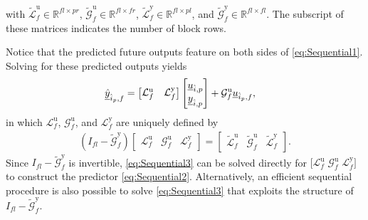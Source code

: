 with ${\widetilde{\mathcal{L}}^\mathrm{u}_f\in\mathbb{R}^{fl\times pr}}$, ${\widetilde{\mathcal{G}}^\mathrm{u}_f\in\mathbb{R}^{fl\times fr}}$, ${\widetilde{\mathcal{L}}^\mathrm{y}_f\in\mathbb{R}^{fl\times pl}}$, and ${\widetilde{\mathcal{G}}^\mathrm{y}_f\in\mathbb{R}^{fl\times fl}}$. The subscript of these matrices indicates the number of block rows.

Notice that the predicted future outputs feature on both sides of \eqref{eq:Sequential1}. Solving for these predicted outputs yields
\begin{align}\label{eq:Sequential2}
    \underline{\hat{y}}_{\hat{i}_p,f} &=
    \begin{bmatrix}
        \mathcal{L}^\mathrm{u}_f & \mathcal{L}^\mathrm{y}_f 
    \end{bmatrix}    
    \begin{bmatrix}
        \underline{u}_{\hat{i},p}\\
        \underline{y}_{\hat{i},p}
    \end{bmatrix}+
    \mathcal{G}^\mathrm{u}_f
    \underline{u}_{\hat{i}_p,f},
\end{align}
in which $\mathcal{L}^\mathrm{u}_f$, $\mathcal{G}^\mathrm{u}_f$, and $\mathcal{L}^\mathrm{y}_f$ are uniquely defined by
\begin{align}\label{eq:Sequential3}
    \left(I_{fl}-\widetilde{\mathcal{G}}^\mathrm{y}_f\right)
    \begin{bmatrix}
        \mathcal{L}^\mathrm{u}_f & \mathcal{G}^\mathrm{u}_f & \mathcal{L}^\mathrm{y}_f
    \end{bmatrix}=
    \begin{bmatrix}
        \widetilde{\mathcal{L}}^\mathrm{u}_f & \widetilde{\mathcal{G}}^\mathrm{u}_f & \widetilde{\mathcal{L}}^\mathrm{y}_f
    \end{bmatrix}.
\end{align}
Since $I_{fl}-\widetilde{\mathcal{G}}^\mathrm{y}_f$ is invertible, \eqref{eq:Sequential3} can be solved directly for $\big[\mathcal{L}^\mathrm{u}_f \; \mathcal{G}^\mathrm{u}_f \; \mathcal{L}^\mathrm{y}_f\big]$ to construct the predictor \eqref{eq:Sequential2}. Alternatively, an efficient sequential procedure is also possible to solve \eqref{eq:Sequential3} that exploits the structure of $I_{fl}-\widetilde{\mathcal{G}}^\mathrm{y}_f$.

